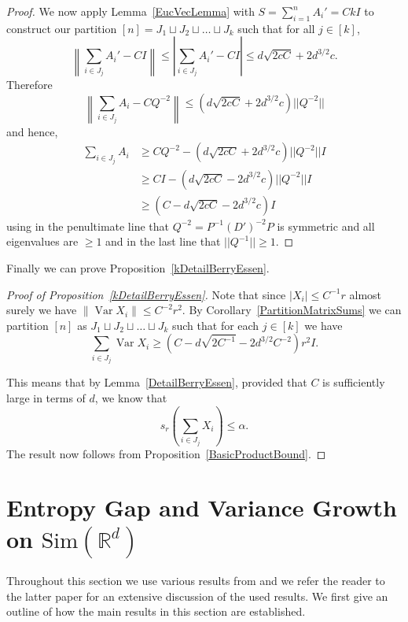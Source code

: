 \documentclass[10pt, english,oneside,reqno]{amsart}
\theoremstyle{plain}
\theoremstyle{remark}
\numberwithin{equation}{section}
\numberwithin{figure}{section}
\DeclareMathOperator{\var}{Var}
\newcommand{\R}{\mathbb{R}}
\begin{document}
\begin{proof}
    We now apply Lemma~\ref{EucVecLemma} with $S = \sum_{i=1}^n A_i' = CkI$ to construct our partition $[n] = J_1 \sqcup J_2 \sqcup \dots \sqcup J_k$ such that for all $j \in [k]$, $$\left\| \sum_{i \in J_j} A_i' - CI \right\| \leq \left| \sum_{i \in J_j} A_i' - CI \right| \leq d \sqrt{2 c C} + 2 d^{3/2} c.$$ Therefore
		$$\left\| \sum_{i \in J_j} A_i - CQ^{-2} \right\| \leq (d \sqrt{2 c C} + 2 d^{3/2} c)||Q^{-2}||$$
		and hence,
		\begin{align*}
		\sum_{i \in J_j} A_i  & \geq C  Q^{-2} - \left( d \sqrt{2 c C} + 2 d^{3/2} c\right)  ||Q^{-2}|| I\\
		&\geq CI - \left(d \sqrt{2 c C} - 2 d^{3/2} c\right) ||Q^{-2}|| I \\
		& \geq \left(C - d \sqrt{2 c C} - 2 d^{3/2} c\right) I
		\end{align*} using in the penultimate line that $Q^{-2} = P^{-1}(D')^{-2}P$ is symmetric and all eigenvalues are $\geq 1$ and in the last line that $||Q^{-1}|| \geq 1$.
\end{proof}

Finally we can prove Proposition~\ref{kDetailBerryEssen}.

\begin{proof}[Proof of Proposition~\ref{kDetailBerryEssen}]
    Note that since $|X_i| \leq C^{-1} r$ almost surely we have $\| \var X_i \| \leq C^{-2} r^2$. By Corollary~\ref{PartitionMatrixSums} we can partition $[n]$ as $J_1 \sqcup J_2 \sqcup \dots \sqcup J_k$ such that for each $j \in [k]$ we have $$\sum_{i \in J_j} \var X_i \geq \left( C - d \sqrt{2C^{-1}} - 2 d^{3/2} C^{-2} \right) r^{2} I.$$

    This means that by Lemma~\ref{DetailBerryEssen}, provided that $C$ is sufficiently large in terms of $d$, we know that $$s_r\left( \sum_{i \in J_j} X_i \right) \leq \alpha.$$ The result now follows from Proposition~\ref{BasicProductBound}.
\end{proof}



    \section{Entropy Gap and Variance Growth on $\mathrm{Sim}(\R^d)$}
    
    \label{EntropyIsomSection}

Throughout this section we use various results from \cite{KittleKoglerEntropy} and we refer the reader to the latter paper for an extensive discussion of the used results. We first give an outline of how  the main results in this section are established. 
\end{document}
